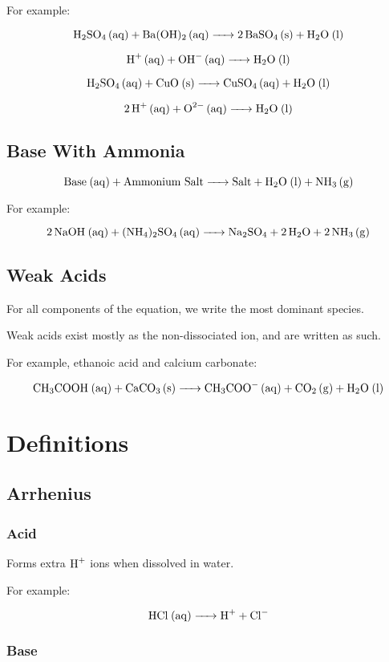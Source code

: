 \documentclass[a4paper,11pt]{article}
\begin{document}
For example:

$$
\ce{H2SO4 (aq) + Ba(OH)2 (aq) -> 2BaSO4 (s) + H2O (l)}
$$

$$
\ce{H+ (aq) + OH- (aq) -> H2O (l)}
$$

$$
\ce{H2SO4 (aq) + CuO (s) -> CuSO4 (aq) + H2O (l)}
$$

$$
\ce{2H+ (aq) + O^2- (aq) -> H2O (l)}
$$


\subsection{Base With Ammonia}

$$
\ce{\text{Base} (aq) + \text{Ammonium Salt} -> \text{Salt} + H2O (l) + NH3 (g)}
$$

For example:

$$
\ce{2NaOH (aq) + (NH4)2SO4 (aq) -> Na2SO4 + 2H2O + 2NH3 (g)}
$$


\subsection{Weak Acids}

For all components of the equation, we write the most dominant species.

Weak acids exist mostly as the non-dissociated ion, and are written as such.

For example, ethanoic acid and calcium carbonate:

$$
\ce{CH3COOH (aq) + CaCO3 (s) -> CH3COO- (aq) + CO2 (g) + H2O (l)}
$$




\section{Definitions}

\subsection{Arrhenius}

\subsubsection{Acid}

Forms extra $\ce{H+}$ ions when dissolved in water.

For example:

$$
\ce{HCl (aq) -> H+ + Cl-}
$$


\subsubsection{Base}
\end{document}
